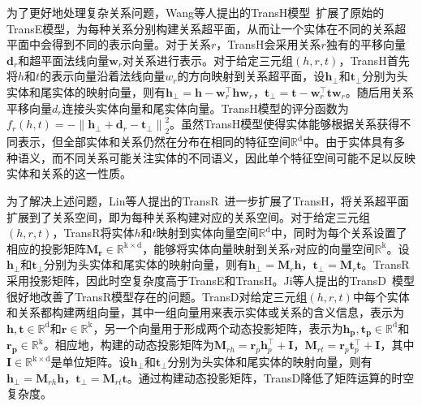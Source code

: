 \documentclass[algorithmlist, AutoFakeBold, AutoFakeSlant, figurelist, tablelist, nomlist, engineering]{seuthesix}
\begin{document}
为了更好地处理复杂关系问题，Wang等人提出的TransH模型~\cite{wang2014knowledge}扩展了原始的TransE模型，为每种关系分别构建关系超平面，从而让一个实体在不同的关系超平面中会得到不同的表示向量。对于关系$r$，TransH会采用关系$r$独有的平移向量$\bm{d}_r$和超平面法线向量$\bm{w}_r$对关系进行表示。对于给定三元组$(h, r, t)$，TransH首先将$h$和$t$的表示向量沿着法线向量$w_r$的方向映射到关系超平面，设$\bm{h}_\perp$和$\bm{t}_\perp$分别为头实体和尾实体的映射向量，则有$\bm{h}_{\perp} = \bm{h} - \bm{w}_r^{\top} \bm{h} \bm{w}_r$，$\bm{t}_{\perp} = \bm{t} - \bm{w}_r^{\top} \bm{t} \bm{w}_r$。随后用关系平移向量$d_r$连接头实体向量和尾实体向量。TransH模型的评分函数为$f_r(h, t) = -\left\|\bm{h}_{\perp} + \bm{d}_r - \bm{t}_{\perp}\right\|_2^2$。虽然TransH模型使得实体能够根据关系获得不同表示，但全部实体和关系仍然在分布在相同的特征空间$\mathbb{R}^{\mathrm{d}}$中。由于实体具有多种语义，而不同关系可能关注实体的不同语义，因此单个特征空间可能不足以反映实体和关系的这一性质。

为了解决上述问题，Lin等人提出的TransR~\cite{lin2015learning}进一步扩展了TransH，将关系超平面扩展到了关系空间，即为每种关系构建对应的关系空间。对于给定三元组$(h, r, t)$，TransR将实体$h$和$t$映射到实体向量空间$\mathbb{R}^{\mathrm{d}}$中，同时为每个关系设置了相应的投影矩阵$\mathbf{M_r} \in \mathbb{R}^\mathrm{k \times d}$，能够将实体向量映射到关系$r$对应的向量空间$\mathbb{R}^{\mathrm{k}}$。设$\bm{h_\perp}$和$\bm{t_\perp}$分别为头实体和尾实体的映射向量，则有$\bm{h}_{\perp}=\mathbf{M}_r \bm{h}$，$\bm{t}_{\perp} = \mathbf{M}_r \bm{t}$。TransR采用投影矩阵，因此时空复杂度高于TransE和TransH。Ji等人提出的TransD~\cite{ji2015knowledge}模型很好地改善了TransR模型存在的问题。TransD对给定三元组$(h, r, t)$中每个实体和关系都构建两组向量，其中一组向量用来表示实体或关系的含义信息，表示为$\bm{h, t} \in \mathbb{R}^{\mathrm{d}}$和$\bm{r} \in \mathbb{R}^{\mathrm{k}}$，另一个向量用于形成两个动态投影矩阵，表示为$\bm{h_p, t_p} \in \mathbb{R}^{\mathrm{d}}$和$\bm{r_p} \in \mathbb{R}^{\mathrm{k}}$。相应地，构建的动态投影矩阵为$\mathbf{M}_{r h} = \bm{r}_p \bm{h}_p^{\top} + \mathbf{I}$，$\mathbf{M}_{r t}=\bm{r}_p \bm{t}_p^{\top} + \mathbf{I}$，其中$\mathbf{I} \in \mathbb{R}^{\mathrm{k \times d}}$是单位矩阵。设$\bm{h_\perp}$和$\bm{t_\perp}$分别为头实体和尾实体的映射向量，则有$\bm{h}_{\perp}=\mathbf{M}_{r h} \bm{h}$，$\bm{t}_{\perp}=\mathbf{M}_{r t} \bm{t}$。通过构建动态投影矩阵，TransD降低了矩阵运算的时空复杂度。
\end{document}
